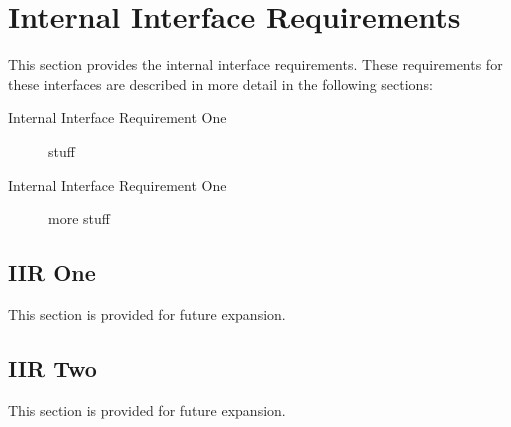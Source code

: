 \KNEADSECTIONNEWPAGE
\section{Internal Interface Requirements}
\label{lab:sec_InternalInterfaceRequirements}



This section provides the internal interface requirements.
These requirements for these interfaces are described in more detail in the following sections:
\begin{description}
	\item[Internal Interface Requirement One] stuff%
	\item[Internal Interface Requirement One] more stuff%
\end{description}


\KNEADSUBSECTIONNEWPAGE
\subsection{IIR One}
\label{loc:IIR_One}

This section is provided for future expansion.
%

\KNEADSUBSECTIONNEWPAGE
\subsection{IIR Two}
\label{loc:IIR_Two}

This section is provided for future expansion.
%
